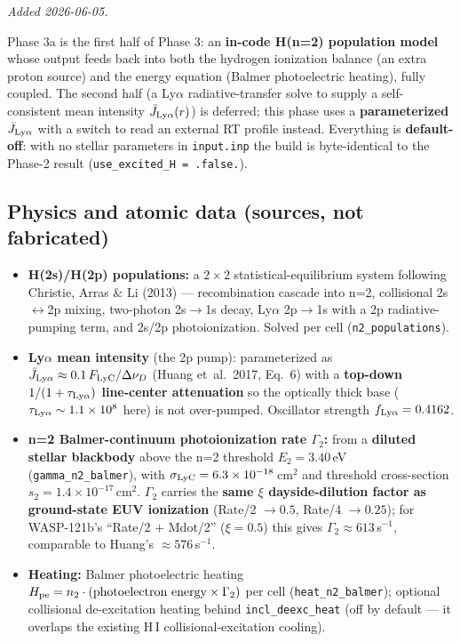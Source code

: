 \documentclass[english,a4paper]{kiseon_memo}
\begin{document}
\emph{Added 2026-06-05.}

Phase 3a is the first half of Phase 3: an \textbf{in-code H(n=2) population model}
whose output feeds back into both the hydrogen ionization balance (an extra proton
source) and the energy equation (Balmer photoelectric heating), fully coupled. The
second half (a Ly\(\alpha\) radiative-transfer solve to supply a self-consistent
mean intensity \(\bar J_{{\rm Ly}\alpha}(r)\)) is deferred; this phase uses a
\textbf{parameterized} \(\bar J_{{\rm Ly}\alpha}\) with a switch to read an external
RT profile instead. Everything is \textbf{default-off}: with no stellar parameters
in \texttt{input.inp} the build is byte-identical to the Phase-2 result
(\verb|use_excited_H = .false.|).

\subsection{Physics and atomic data (sources, not fabricated)}
\begin{itemize}
  \item \textbf{H(2s)/H(2p) populations:} a \(2\times2\) statistical-equilibrium
    system following Christie, Arras \& Li (2013) --- recombination cascade into
    n=2, collisional 2s\(\leftrightarrow\)2p mixing, two-photon 2s\(\to\)1s decay,
    Ly\(\alpha\) 2p\(\to\)1s with a 2p radiative-pumping term, and 2s/2p
    photoionization. Solved per cell (\verb|n2_populations|).
  \item \textbf{Ly\(\alpha\) mean intensity} (the 2p pump): parameterized as
    \(\bar J_{{\rm Ly}\alpha}\approx 0.1\,F_{\rm LyC}/\Delta\nu_D\) (Huang et~al.\
    2017, Eq.~6) with a \textbf{top-down \(1/(1+\tau_{{\rm Ly}\alpha})\)
    line-center attenuation} so the optically thick base
    (\(\tau_{{\rm Ly}\alpha}\sim1.1\times10^{8}\) here) is not over-pumped.
    Oscillator strength \(f_{{\rm Ly}\alpha}=0.4162\).
  \item \textbf{n=2 Balmer-continuum photoionization rate \(\Gamma_2\):} from a
    \textbf{diluted stellar blackbody} above the n=2 threshold
    \(E_2=3.40\)\,eV (\verb|gamma_n2_balmer|), with \(\sigma_{\rm LyC}=6.3\times
    10^{-18}\)\,cm\(^2\) and threshold cross-section \(s_2=1.4\times10^{-17}\)\,cm\(^2\).
    \(\Gamma_2\) carries the \textbf{same \(\xi\) dayside-dilution factor as
    ground-state EUV ionization} (Rate/2 \(\to0.5\), Rate/4 \(\to0.25\)); for
    WASP-121b's ``Rate/2 $+$ Mdot/2'' (\(\xi=0.5\)) this gives
    \(\Gamma_2\approx613\)\,s\(^{-1}\), comparable to Huang's \(\approx576\)\,s\(^{-1}\).
  \item \textbf{Heating:} Balmer photoelectric heating
    \(H_{\rm pe}=n_2\cdot(\text{photoelectron energy}\times\Gamma_2)\) per cell
    (\verb|heat_n2_balmer|); optional collisional de-excitation heating behind
    \verb|incl_deexc_heat| (off by default --- it overlaps the existing H\,I
    collisional-excitation cooling).
\end{itemize}
\end{document}

